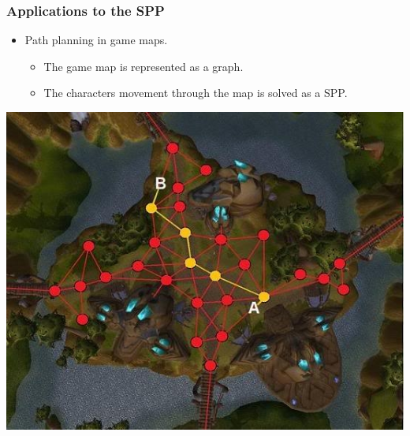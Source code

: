 \begin{frame}[t]  
\frametitle{Applications to the SPP}
  \begin{itemize}
  	\item Path planning in game maps.
  	\vspace{2mm}
  	\begin{itemize}
  		\item The game map is represented as a graph.
  		 \vspace{2mm}
  		\item The characters movement through the map is solved as a SPP.
  	\end{itemize}
  \end{itemize}
  \vspace{4mm}
  \begin{center}
    \includegraphics[scale=0.4]{figs/game_maps}
  \end{center}
\end{frame}

